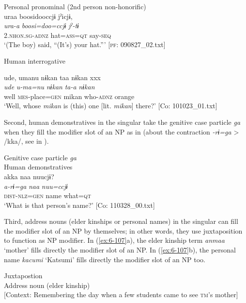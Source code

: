 \ex Personal pronominal (2nd person non-honorific)\\
{\TM}
\glll  uraa  {\textbar}boosi{\textbar}dooccjɨ  jˀicjɨ,\\
\textit{ura-a}  \textit{boosi=doo=ccjɨ}  \textit{jˀ-tɨ}\\
2.\textsc{nhon}.\textsc{sg}-\textsc{adnz}  hat=\textsc{ass}=\textsc{qt}  say-\textsc{seq}\\
\glt ‘(The boy) said, “(It’s) your hat.”’ [\textsc{pf}: 090827\_02.txt]
\z

\ex  Human interrogative

{\TM}
\glll ude,  umanu  nɨkan  taa  nɨkan  xxx\\
      \textit{ude}  \textit{u-ma=nu}  \textit{nɨkan}  \textit{ta-a}  \textit{nɨkan}  \\
      well  \textsc{mes}-place=\textsc{gen}  mikan  who-\textsc{adnz}  orange\\
\glt ‘Well, whose \textit{mikan} is (this) one [lit. \textit{mikan}] there?’ [Co: 101023\_01.txt]
\z

  Second, human demonstratives in the singular take the genitive case particle \textit{ga} when they fill the modifier slot of an NP as in  (about the contraction \textit{-rɨ=ga} > /kka/, see  in ).

\ea\label{ex:6-106}
  Genitive case particle \textit{ga}\\
  Human demonstratives\\

  {\TM}
\glll akka  naa  nuucjɨ?\\
\textit{a-rɨ=ga}  \textit{naa}  \textit{nuu=ccjɨ}\\
    \textsc{dist}-\textsc{nlz}=\textsc{gen}  name  what=\textsc{qt}\\
\glt    ‘What is that person’s name?’ [Co: 110328\_00.txt]
\z

  Third, address nouns (elder kinships or personal names) in the singular can fill the modifier slot of an NP by themselves; in other words, they use juxtaposition to function as NP modifier. In (\ref{ex:6-107}a), the elder kinship term \textit{anmaa} ‘mother’ fills directly the modifier slot of an NP. In (\ref{ex:6-107}b), the personal name \textit{kacumi} ‘Katsumi’ fills directly the modifier slot of an NP too.

\ea\label{ex:6-107}
 Juxtapostion\\

 \ea Address noun (elder kinship)\\{}
[Context: Remembering the day when a few students came to see \textsc{tm}’s mother]

